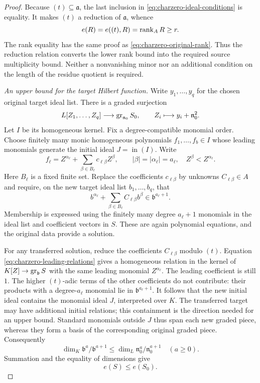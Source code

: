 \begin{proof}
Because $(t)\subseteq\mathfrak a$, the last inclusion in
\eqref{eq:charzero-ideal-conditions} is equality.  It makes $(t)$
a reduction of $\mathfrak a$, whence
\begin{equation}\label{eq:charzero-source-bound}
 e(R)=e((t),R)=\operatorname{rank}_A R\ge r.
\end{equation}
The rank equality has the same proof as
\eqref{eq:charzero-original-rank}. Thus the reduction relation converts
the lower rank bound into the required source multiplicity bound.
Neither a nonvanishing minor nor an additional condition on the length
of the residue quotient is required.

\smallskip
\noindent\emph{An upper bound for the target Hilbert function.}
Write $y_1,\ldots,y_q$ for the chosen original target ideal list.
There is a graded surjection
\[
 L[Z_1,\ldots,Z_q]\longrightarrow\operatorname{gr}_{\mathfrak n_0}S_0,
 \qquad Z_i\longmapsto y_i+\mathfrak n_0^2.
\]
Let $I$ be its homogeneous kernel.  Fix a degree-compatible monomial
order.  Choose finitely many monic homogeneous polynomials
$f_1,\ldots,f_b\in I$ whose leading monomials generate the initial
ideal $J=\operatorname{in}(I)$.  Write
\[
 f_\ell=Z^{\alpha_\ell}
       +\sum_{\beta\in B_\ell}c_{\ell\beta}Z^\beta,
 \qquad |\beta|=|\alpha_\ell|=a_\ell,
 \quad Z^\beta<Z^{\alpha_\ell}.
\]
Here $B_\ell$ is a fixed finite set.  Replace the coefficients
$c_{\ell\beta}$ by unknowns $C_{\ell\beta}\in A$ and require, on
the new target ideal list $b_1,\ldots,b_q$, that
\begin{equation}\label{eq:charzero-leading-relations}
 b^{\alpha_\ell}
  +\sum_{\beta\in B_\ell}C_{\ell\beta}b^\beta
       \in\mathfrak b^{a_\ell+1}.
\end{equation}
Membership is expressed using the finitely many degree
$a_\ell+1$ monomials in the ideal list and coefficient vectors in
$S$.  These are again polynomial equations, and the original data
provide a solution.

For any transferred solution, reduce the coefficients
$C_{\ell\beta}$ modulo $(t)$.  Equation
\eqref{eq:charzero-leading-relations} gives a homogeneous relation in
the kernel of $K[Z]\to\operatorname{gr}_{\mathfrak b}S$ with the same leading
monomial $Z^{\alpha_\ell}$.  The leading coefficient is still $1$.
The higher $(t)$-adic terms of the other coefficients do not contribute:
their products with a degree-$a_\ell$ monomial lie in
$\mathfrak b^{a_\ell+1}$.  It follows that the new initial ideal
contains the monomial ideal $J$, interpreted over $K$. The transferred
target may have additional initial relations; this containment is the
direction needed for an upper bound. Standard monomials outside $J$
thus span each new graded piece, whereas they
form a basis of the corresponding original graded piece.  Consequently
\[
 \dim_K\mathfrak b^a/\mathfrak b^{a+1}
 \le \dim_L\mathfrak n_0^a/\mathfrak n_0^{a+1}
 \quad(a\ge0).
\]
Summation and the equality of dimensions give
\begin{equation}\label{eq:charzero-target-bound}
 e(S)\le e(S_0).
\end{equation}


\end{proof}
